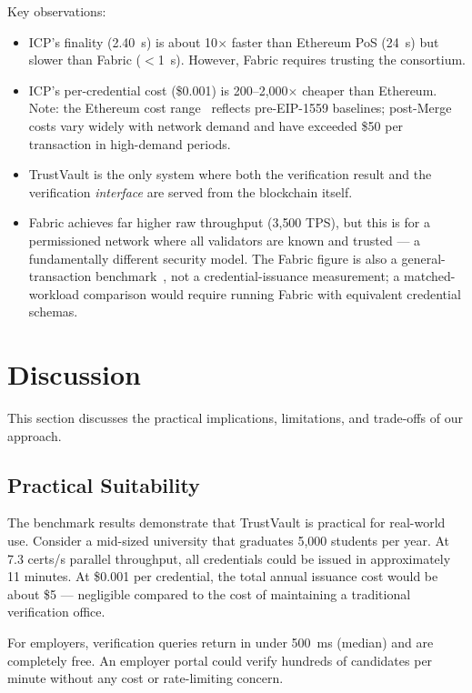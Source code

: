 \documentclass[journal]{IEEEtran}
\begin{document}
Key observations:
\begin{itemize}[leftmargin=*]
  \item ICP's finality (2.40~s) is about 10$\times$ faster than Ethereum PoS (24~s) but slower than Fabric ($<$1~s). However, Fabric requires trusting the consortium.
  \item ICP's per-credential cost (\$0.001) is 200--2{,}000$\times$ cheaper than Ethereum. Note: the Ethereum cost range~\cite{wood2014ethereum} reflects pre-EIP-1559 baselines; post-Merge costs vary widely with network demand and have exceeded \$50 per transaction in high-demand periods.
  \item TrustVault is the only system where both the verification result and the verification \emph{interface} are served from the blockchain itself.
  \item Fabric achieves far higher raw throughput (3{,}500 TPS), but this is for a permissioned network where all validators are known and trusted — a fundamentally different security model. The Fabric figure is also a general-transaction benchmark~\cite{androulaki2018fabric}, not a credential-issuance measurement; a matched-workload comparison would require running Fabric with equivalent credential schemas.
\end{itemize}

\section{Discussion}
\label{sec:discussion}

This section discusses the practical implications, limitations, and trade-offs of our approach.

\subsection{Practical Suitability}

The benchmark results demonstrate that TrustVault is practical for real-world use. Consider a mid-sized university that graduates 5,000 students per year. At 7.3 certs/s parallel throughput, all credentials could be issued in approximately 11 minutes. At \$0.001 per credential, the total annual issuance cost would be about \$5 — negligible compared to the cost of maintaining a traditional verification office.

For employers, verification queries return in under 500~ms (median) and are completely free. An employer portal could verify hundreds of candidates per minute without any cost or rate-limiting concern.
\end{document}
